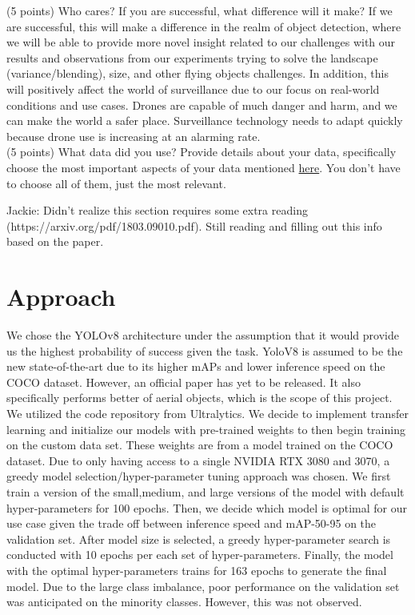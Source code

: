 \documentclass[10pt,twocolumn,letterpaper]{article}
\begin{document}
(5 points) Who cares? If you are successful, what difference will it make? 
If we are successful, this will make a difference in the realm of object detection, where we will be able to provide more novel insight related to our challenges with our results and observations from our experiments trying to solve the landscape (variance/blending), size, and other flying objects challenges. In addition, this will positively affect the world of surveillance due to our focus on real-world conditions and use cases. Drones are capable of much danger and harm, and we can make the world a safer place. Surveillance technology needs to adapt quickly because drone use is increasing at an alarming rate.\\

(5 points) What data did you use? Provide details about your data, specifically choose the most important aspects of your data mentioned \href{https://arxiv.org/abs/1803.09010}{here}. You don’t have to choose all of them, just the most relevant.

Jackie: Didn't realize this section requires some extra reading (https://arxiv.org/pdf/1803.09010.pdf). Still reading and filling out this info based on the paper.
\section{Approach}
We chose the YOLOv8 architecture under the assumption that it would provide us the highest probability of success given the task. YoloV8 is 
assumed to be the new state-of-the-art due to its higher mAPs and lower inference speed on the COCO dataset. However, an official paper has 
yet to be released. It also specifically performs better of aerial objects, which is the scope of this project. We utilized the code repository 
from Ultralytics. We decide to implement transfer learning and initialize our models with pre-trained weights to then begin training on the 
custom data set. These weights are from a model trained on the COCO dataset. Due to only having access to a single NVIDIA RTX 3080 and 3070, 
a greedy model selection/hyper-parameter tuning approach was chosen. We first train a version of the small,medium, and large versions of the 
model with default hyper-parameters for 100 epochs. Then, we decide which model is optimal for our use case given the trade off between inference 
speed and mAP-50-95 on the validation set. After model size is selected, a greedy hyper-parameter search is conducted with 10 epochs per each 
set of hyper-parameters. Finally, the model with the optimal hyper-parameters trains for 163 epochs to generate the final model.
Due to the large class imbalance, poor performance on the validation set was anticipated on the minority classes. However, this was not observed.
\end{document}
